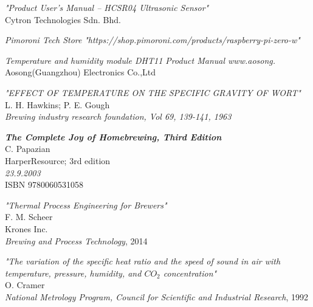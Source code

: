 \documentclass[twoside]{ctuthesis}
\theoremstyle{plain}
\theoremstyle{definition}
\theoremstyle{note}
\begin{document}
\begin{thebibliography}{9}
	\textit{"Product User’s Manual – HCSR04 Ultrasonic Sensor"}\\
	Cytron Technologies Sdn. Bhd.
	
	\textit{Pimoroni Tech Store}
	\textit{"https://shop.pimoroni.com/products/raspberry-pi-zero-w"}
	
	\textit{Temperature and humidity module DHT11 Product Manual
		www.aosong.}\\
	Aosong(Guangzhou) Electronics Co.,Ltd
	
	\textit{"EFFECT OF TEMPERATURE ON THE SPECIFIC GRAVITY OF WORT"}\\
	L. H. Hawkins; P. E. Gough\\
	\textit{Brewing industry research foundation, Vol 69, 139-141, 1963}
	
	\textit{\textbf{The Complete Joy of Homebrewing, Third Edition}}\\
	C. Papazian\\
	HarperResource; 3rd edition\\
	\textit{23.9.2003}\\
	ISBN 9780060531058
	
	\textit{"Thermal Process Engineering for Brewers"}\\
	F. M. Scheer\\
	Krones Inc.\\
	\textit{Brewing and Process Technology}, 2014
	
	\textit{"The variation of the specific heat ratio and the speed of sound in air with temperature, pressure, humidity, and $CO_2$ concentration"}\\
	O. Cramer\\
	\textit{National Metrology Program, Council for Scientific and Industrial Research}, 1992
	
	
\end{thebibliography}

\end{document}
